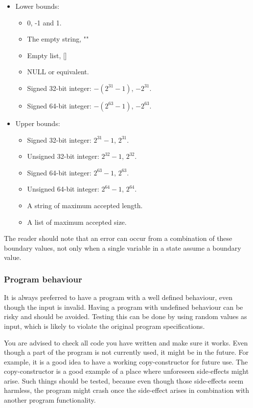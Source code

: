\documentclass[11pt,a4paper,twoside]{article}
\begin{document}
\begin{itemize}
    \item Lower bounds:
    \begin{itemize}
        \item 0, -1 and 1.
        \item The empty string, ""
        \item Empty list, []
        \item NULL or equivalent.
        \item Signed 32-bit integer: $-(2^{31}-1)$, $-2^{31}$.
        \item Signed 64-bit integer: $-(2^{63}-1)$, $-2^{63}$.
    \end{itemize}
    \item Upper bounds:
    \begin {itemize}
        \item Signed 32-bit integer: $2^{31}-1$, $2^{31}$.
        \item Unsigned 32-bit integer: $2^{32}-1$, $2^{32}$.
        \item Signed 64-bit integer: $2^{63}-1$, $2^{63}$.
        \item Unsigned 64-bit integer: $2^{64}-1$, $2^{64}$.
        \item A string of maximum accepted length.
        \item A list of maximum accepted size.
    \end{itemize}
\end{itemize}

The reader should note that an error can occur from a combination of these
boundary values, not only when a single variable in a state assume a boundary
value.


\subsubsection{Program behaviour}

It is always preferred to have a program with a well defined behaviour, even
though the input is invalid. Having a program with undefined behaviour can be
risky and should be avoided. Testing this can be done by using random values as
input, which is likely to violate the original program specifications.

You are advised to check all code you have written and make sure it works. Even
though a part of the program is not currently used, it might be in the future.
For example, it is a good idea to have a working copy-constructor for future
use. The copy-constructor is a good example of a place where unforeseen
side-effects might arise. Such things should be tested, because even though
those side-effects seem harmless, the program might crash once the side-effect
arises in combination with another program functionality.
\end{document}
